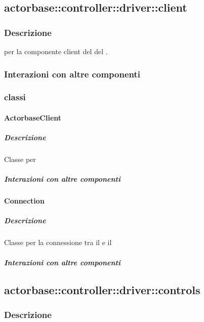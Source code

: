 \documentclass{scalatekids-article}
\begin{document}
\subsection{actorbase::controller::driver::client}

\subsubsection{Descrizione}

 per la componente client del  del .

\subsubsection{Interazioni con altre componenti}

\subsubsection{classi}

\paragraph{ActorbaseClient}

\subparagraph{Descrizione}

Classe per %

\subparagraph{Interazioni con altre componenti}


\paragraph{Connection}

\subparagraph{Descrizione}

Classe per la connessione tra il  e il 

\subparagraph{Interazioni con altre componenti}

\subsection{actorbase::controller::driver::controls}

\subsubsection{Descrizione}
\end{document}
